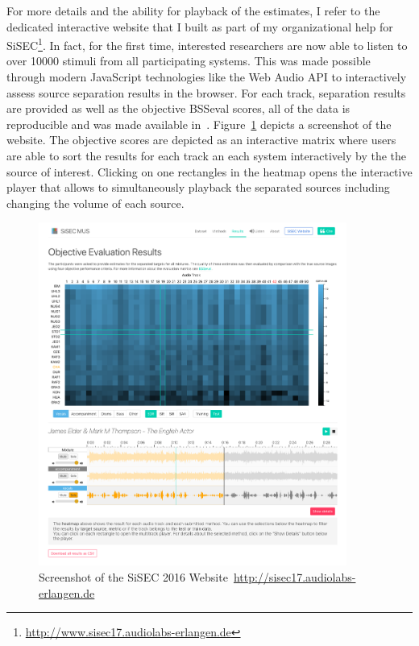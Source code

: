For more details and the ability for playback of the estimates, I refer to the dedicated interactive website that I built as part of my organizational help for SiSEC\footnote{\url{http://www.sisec17.audiolabs-erlangen.de}}.
In fact, for the first time, interested researchers are now able to listen to over 10000 stimuli from all participating systems.
This was made possible through modern JavaScript technologies like the Web Audio API to interactively assess source separation results in the browser.
For each track, separation results are provided as well as the objective BSSeval scores, all of the data is reproducible and was made available in~\cite{oss_sisecwebsite}.
Figure~\ref{fig:sisec_website} depicts a screenshot of the website.
The objective scores are depicted as an interactive matrix where users are able to sort the results for each track an each system interactively by the the source of interest.
Clicking on one rectangles in the heatmap opens the interactive player that allows to simultaneously playback the separated sources including changing the volume of each source.

\begin{figure}[t]
\centering
\includegraphics[width=0.9\textwidth]{Chapters/06_Separation_Unknown/figures/sisec_website.png}
\caption{Screenshot of the SiSEC 2016 Website~\url{http://sisec17.audiolabs-erlangen.de}}
\label{fig:sisec_website}

\end{figure}

